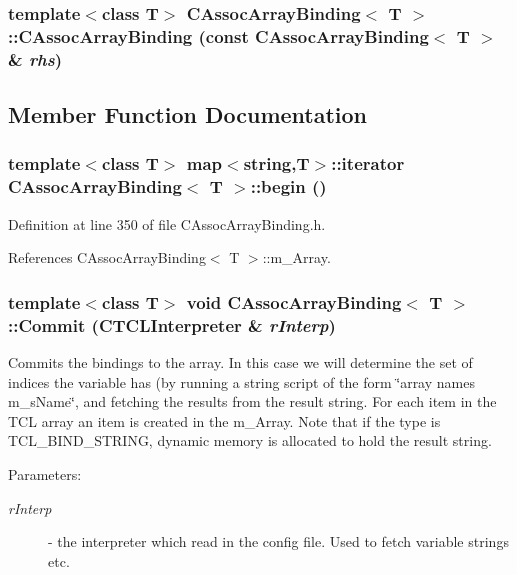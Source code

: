 \subsubsection{\setlength{\rightskip}{0pt plus 5cm}template$<$class T$>$ CAssoc\-Array\-Binding$<$ T $>$::CAssoc\-Array\-Binding (const CAssoc\-Array\-Binding$<$ T $>$ \& {\em rhs})\hspace{0.3cm}{\tt  [private]}}\label{classCAssocArrayBinding_c0}




\subsection{Member Function Documentation}
\subsubsection{\setlength{\rightskip}{0pt plus 5cm}template$<$class T$>$ map$<$string,T$>$::iterator CAssoc\-Array\-Binding$<$ T $>$::begin ()\hspace{0.3cm}{\tt  [inline]}}\label{classCAssocArrayBinding_a4}




Definition at line 350 of file CAssoc\-Array\-Binding.h.

References CAssoc\-Array\-Binding$<$ T $>$::m\_\-Array.
\subsubsection{\setlength{\rightskip}{0pt plus 5cm}template$<$class T$>$ void CAssoc\-Array\-Binding$<$ T $>$::Commit ({\bf CTCLInterpreter} \& {\em r\-Interp})\hspace{0.3cm}{\tt  [virtual]}}\label{classCAssocArrayBinding_a13}


Commits the bindings to the array. In this case we will determine the set of indices the variable has (by running a string script of the form \char`\"{}array names m\_\-s\-Name\char`\"{}, and fetching the results from the result string. For each item in the TCL array an item is created in the  m\_\-Array. Note that if the type is TCL\_\-BIND\_\-STRING, dynamic memory is allocated to hold the result string. \begin{Desc}
\item[Parameters: ]\par
\begin{description}
\item[{\em 
r\-Interp}]- the interpreter which read in the config file. Used to fetch variable strings etc. \end{description}
\end{Desc}


